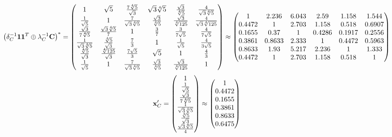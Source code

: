 \documentclass[10pt,a4paper]{article}
\begin{document}
	\[
		\left(\delta_{C}^{-1}\bold{11}^T \oplus \lambda_{C}^{-1}\bold{C}\right)^* = 
		\begin{pmatrix}
			{1} {} & {\sqrt{5}} {} & \frac{{7}\sqrt[4]{5}} {\sqrt{3}} & {\sqrt{3}\sqrt[4]{5}} {} & \frac{\sqrt{3}} {\sqrt[4]{5}} & \frac{{4}} {\sqrt{3}\sqrt[4]{5}} \\
			\frac{1} {\sqrt{5}} & {1} {} & \frac{{7}} {\sqrt{3}\sqrt[4]{5}} & \frac{\sqrt{3}} {\sqrt[4]{5}} & \frac{\sqrt{3}} {\sqrt[4]{125}} & \frac{{4}} {\sqrt{3}\sqrt[4]{125}} \\
			\frac{\sqrt{3}} {{7}\sqrt[4]{5}} & \frac{\sqrt{3}\sqrt[4]{5}} {{7}} & {1} {} & \frac{{3}} {{7}} & \frac{{3}} {{7}\sqrt{5}} & \frac{{4}} {{7}\sqrt{5}} \\
			\frac{1} {\sqrt{3}\sqrt[4]{5}} & \frac{\sqrt[4]{5}} {\sqrt{3}} & \frac{{7}} {{3}} & {1} {} & \frac{1} {\sqrt{5}} & \frac{{4}} {{3}\sqrt{5}} \\
			\frac{\sqrt[4]{5}} {\sqrt{3}} & \frac{\sqrt[4]{125}} {\sqrt{3}} & \frac{{7}\sqrt{5}} {{3}} & {\sqrt{5}} {} & {1} {} & \frac{{4}} {{3}} \\
			\frac{1} {\sqrt{5}} & {1} {} & \frac{{7}} {\sqrt{3}\sqrt[4]{5}} & \frac{\sqrt{3}} {\sqrt[4]{5}} & \frac{\sqrt{3}} {\sqrt[4]{125}} & {1} {} \\
		\end{pmatrix}
		\approx
		\begin{pmatrix}
			1        & 2.236    & 6.043    & 2.59     & 1.158    & 1.544    \\
			0.4472   & 1        & 2.703    & 1.158    & 0.518    & 0.6907   \\
			0.1655   & 0.37     & 1        & 0.4286   & 0.1917   & 0.2556   \\
			0.3861   & 0.8633   & 2.333    & 1        & 0.4472   & 0.5963   \\
			0.8633   & 1.93     & 5.217    & 2.236    & 1        & 1.333    \\
			0.4472   & 1        & 2.703    & 1.158    & 0.518    & 1        \\
		\end{pmatrix}
	\]
	\[
		\bold{x}'_{C} = 
		\begin{pmatrix}
			{1} {} \\
			\frac{1} {\sqrt{5}} \\
			\frac{\sqrt{3}} {{7}\sqrt[4]{5}} \\
			\frac{1} {\sqrt{3}\sqrt[4]{5}} \\
			\frac{\sqrt[4]{5}} {\sqrt{3}} \\
			\frac{\sqrt{3}\sqrt[4]{5}} {{4}} \\
		\end{pmatrix}
		\approx
		\begin{pmatrix}
			1        \\
			0.4472   \\
			0.1655   \\
			0.3861   \\
			0.8633   \\
			0.6475   \\
		\end{pmatrix}
	\]
\end{document}
